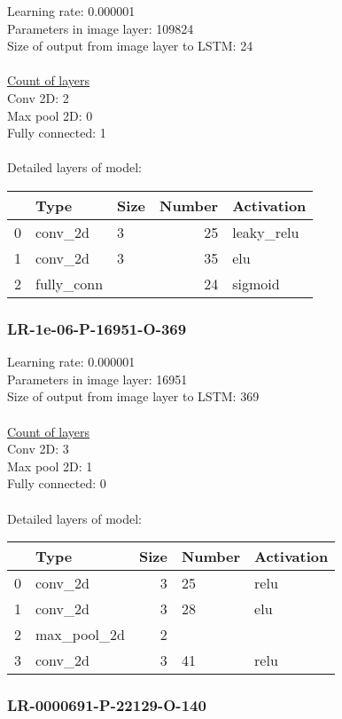 Learning rate: 0.000001
\\Parameters in image layer: 109824
\\Size of output from image layer to LSTM: 24
\\\\\underline{Count of layers} 
\\Conv 2D:           2\\Max pool 2D:      0\\Fully connected:  1
\\\\Detailed layers of model: \\\begin{tabular}{rllrl}
\hline
    & Type       & Size   &   Number & Activation   \\
\hline
  0 & conv\_2d    & 3      &       25 & leaky\_relu   \\
  1 & conv\_2d    & 3      &       35 & elu          \\
  2 & fully\_conn &        &       24 & sigmoid      \\
\hline
\end{tabular}\subsubsection*{LR-1e-06-P-16951-O-369}
Learning rate: 0.000001
\\Parameters in image layer: 16951
\\Size of output from image layer to LSTM: 369
\\\\\underline{Count of layers} 
\\Conv 2D:           3\\Max pool 2D:      1\\Fully connected:  0
\\\\Detailed layers of model: \\\begin{tabular}{rlrll}
\hline
    & Type        &   Size & Number   & Activation   \\
\hline
  0 & conv\_2d     &      3 & 25       & relu         \\
  1 & conv\_2d     &      3 & 28       & elu          \\
  2 & max\_pool\_2d &      2 &          &              \\
  3 & conv\_2d     &      3 & 41       & relu         \\
\hline
\end{tabular}\subsubsection*{LR-0000691-P-22129-O-140}
